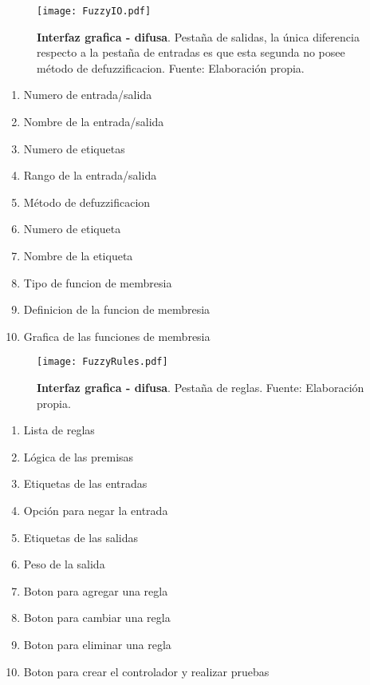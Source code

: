     \vfill

    \pagebreak
    
    \begin{figure}[htb]
        \centering
        \texttt{[image: FuzzyIO.pdf]}
        \caption[Interfaz grafica - difusa - entradas/salidas]{\textbf{Interfaz grafica - difusa}. Pestaña de salidas, la única diferencia respecto a la pestaña de entradas es que esta segunda no posee método de defuzzificacion. Fuente: Elaboración propia.} 
        \label{fig:FuzzyIO}
    \end{figure}

    \begin{multicols}{2}
        \begin{enumerate}[leftmargin=20pt]
            \item Numero de entrada/salida
            \item Nombre de la entrada/salida
            \item Numero de etiquetas
            \item Rango de la entrada/salida
            \item Método de defuzzificacion
            \item Numero de etiqueta
            \item Nombre de la etiqueta
            \item Tipo de funcion de membresia
            \item Definicion de la funcion de membresia
            \item Grafica de las funciones de membresia
        \end{enumerate}
    \end{multicols}

    \begin{figure}[!h]
        \centering
        \texttt{[image: FuzzyRules.pdf]}
        \caption[Interfaz grafica - difusa - reglas]{\textbf{Interfaz grafica - difusa}. Pestaña de reglas. Fuente: Elaboración propia.} 
        \label{fig:FuzzyRules}
    \end{figure}

    \begin{multicols}{2}
        \begin{enumerate}[leftmargin=20pt]
            \item Lista de reglas
            \item Lógica de las premisas
            \item Etiquetas de las entradas
            \item Opción para negar la entrada
            \item Etiquetas de las salidas
            \item Peso de la salida
            \item Boton para agregar una regla
            \item Boton para cambiar una regla
            \item Boton para eliminar una regla
            \item Boton para crear el controlador y realizar pruebas
        \end{enumerate}
    \end{multicols}

